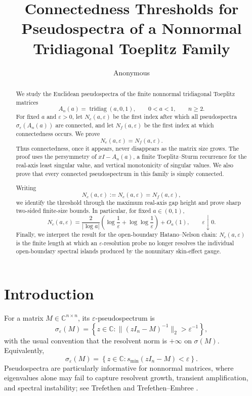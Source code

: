\documentclass[11pt]{amsart}
\title[Connected pseudospectra of tridiagonal Toeplitz matrices]
{Connectedness Thresholds for Pseudospectra of a Nonnormal Tridiagonal Toeplitz Family}
\author{Anonymous}
\numberwithin{equation}{section}
\DeclareMathOperator{\tridiag}{tridiag}
\newcommand{\C}{\mathbb C}
\newcommand{\eps}{\varepsilon}
\newcommand{\A}{A}
\begin{document}
\begin{abstract}
We study the Euclidean pseudospectra of the finite nonnormal tridiagonal Toeplitz matrices
\[
\A_n(a)=\tridiag(a,0,1),\qquad 0<a<1,\qquad n\ge2.
\]
For fixed \(a\) and \(\eps>0\), let \(N_e(a,\eps)\) be the first index after which all pseudospectra
\(\sigma_\eps(\A_n(a))\) are connected, and let \(N_f(a,\eps)\) be the first index at which connectedness occurs.  We prove
\[
N_e(a,\eps)=N_f(a,\eps).
\]
Thus connectedness, once it appears, never disappears as the matrix size grows.  The proof uses the persymmetry of \(xI-\A_n(a)\), a finite Toeplitz--Sturm recurrence for the real-axis least singular value, and vertical monotonicity of singular values.  We also prove that every connected pseudospectrum in this family is simply connected.

Writing
\[
N_c(a,\eps):=N_e(a,\eps)=N_f(a,\eps),
\]
we identify the threshold through the maximum real-axis gap height and prove sharp two-sided finite-size bounds.  In particular, for fixed \(a\in(0,1)\),
\[
N_c(a,\eps)
=
\frac{2}{|\log a|}
\left(
\log\frac1\eps+\log\log\frac1\eps
\right)
+O_a(1),
\qquad \eps\downarrow0.
\]
Finally, we interpret the result for the open-boundary Hatano--Nelson chain: \(N_c(a,\eps)\) is the finite length at which an \(\eps\)-resolution probe no longer resolves the individual open-boundary spectral islands produced by the nonunitary skin-effect gauge.
\end{abstract}

\maketitle

\section{Introduction}

For a matrix \(M\in\C^{n\times n}\), its \(\eps\)-pseudospectrum is
\[
\sigma_\eps(M)
=
\left\{
z\in\C:\|(zI_n-M)^{-1}\|_2>\eps^{-1}
\right\},
\]
with the usual convention that the resolvent norm is \(+\infty\) on \(\sigma(M)\).  Equivalently,
\[
\sigma_\eps(M)
=
\left\{
z\in\C:s_{\min}(zI_n-M)<\eps
\right\}.
\]
Pseudospectra are particularly informative for nonnormal matrices, where eigenvalues alone may fail to capture resolvent growth, transient amplification, and spectral instability; see Trefethen \cite{Trefethen1997} and Trefethen--Embree \cite{TrefethenEmbree2005}.
\end{document}
